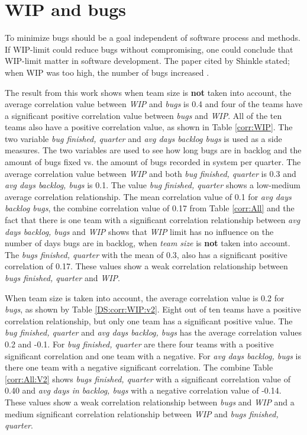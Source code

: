 \documentclass[UKenglish]{ifimaster}  %
\begin{document}
\section{WIP and bugs}
To minimize bugs should be a goal independent of software process and methods. If WIP-limit could reduce bugs without compromising, one could conclude that WIP-limit matter in software development. The paper cited by Shinkle stated; when WIP was too high, the number of bugs increased  \parencite{Shinkle}.

The result from this work shows when team size is \textbf{not} taken into account, the average correlation value between \textit{WIP} and \textit{bugs} is 0.4 and four of the teams have a significant positive correlation value between \textit{bugs} and \textit{WIP}. All of the ten teams also have a positive correlation value, as shown in Table \ref{corr:WIP}. The two variable \textit{bug finished, quarter} and \textit{avg days backlog bugs} is used as a side measures. The two variables are used to see how long bugs are in backlog and the amount of bugs fixed vs. the amount of bugs recorded in system per quarter. The average correlation value between \textit{WIP} and both \textit{bug finished, quarter} is 0.3 and \textit{avg days backlog, bugs} is 0.1. The value \textit{bug finished, quarter} shows a low-medium average correlation relationship. The mean correlation value of 0.1   for  \textit{avg days backlog bugs}, the combine correlation value of 0.17 from Table \ref{corr:All} and the fact that there is one team with a significant correlation relationship between \textit{avg days backlog, bugs} and \textit{WIP} shows that  \textit{WIP} limit has no influence on the number of days bugs are in backlog, when \textit{team size} is \textbf{not} taken into account. The \textit{bugs finished, quarter} with the mean of 0.3, also has a significant positive correlation of 0.17. These values show a weak correlation relationship between \textit{bugs finished, quarter} and \textit{WIP}. 

When team size is taken into account, the average correlation value is 0.2 for \textit{bugs}, as shown by Table \ref{DS:corr:WIP:v2}.  Eight out of ten teams have a positive correlation relationship, but only one team has a significant positive value. The  \textit{bug finished, quarter} and \textit{avg days backlog, bugs}  has the average correlation values 0.2 and -0.1. For \textit{bug finished, quarter} are there four teams with a positive significant correlation and one team with a negative. For \textit{avg days backlog, bugs} is there one team with a negative significant correlation. The combine Table \ref{corr:All:V2} shows \textit{bugs finished, quarter} with a significant correlation value of 0.40 and \textit{avg days in backlog, bugs} with a negative correlation value of -0.14. These values show a weak correlation relationship between \textit{bugs} and \textit{WIP} and a medium significant correlation relationship between \textit{WIP} and \textit{bugs finished, quarter}. 
\end{document}
